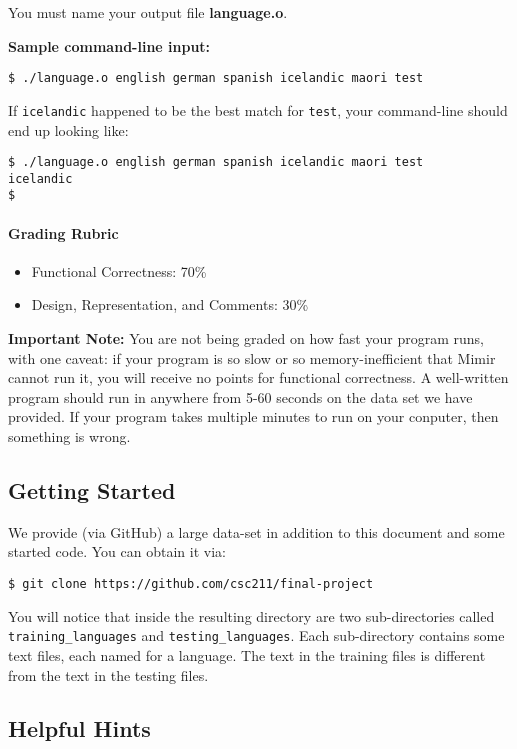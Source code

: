\documentclass[]{article}
\providecommand{\tightlist}{%
  \setlength{\itemsep}{0pt}\setlength{\parskip}{0pt}}
\let\oldparagraph\paragraph
\renewcommand{\paragraph}[1]{\oldparagraph{#1}\mbox{}}
\begin{document}
You must name your output file \textbf{language.o}.

\textbf{Sample command-line input:}

\texttt{\$ ./language.o english german spanish icelandic maori test}

If \texttt{icelandic} happened to be the best match for \texttt{test},
your command-line should end up looking like:

\texttt{\$ ./language.o english german spanish icelandic maori test}\\
\texttt{icelandic}\\
\texttt{\$ }

\paragraph{Grading Rubric}\label{grading-rubric-1}

\begin{itemize}
\tightlist
\item
  Functional Correctness: 70\%
\item
  Design, Representation, and Comments: 30\%
\end{itemize}

\textbf{Important Note:} You are not being graded on how fast your
program runs, with one caveat: if your program is so slow or so
memory-inefficient that Mimir cannot run it, you will receive no points
for functional correctness. A well-written program should run in
anywhere from 5-60 seconds on the data set we have provided. If your
program takes multiple minutes to run on your conputer, then something
is wrong.

\subsection{Getting Started}\label{getting-started}

We provide (via GitHub) a large data-set in addition to this document
and some started code. You can obtain it via:

\texttt{\$ git clone https://github.com/csc211/final-project}

You will notice that inside the resulting directory are two
sub-directories called \texttt{training\_languages} and
\texttt{testing\_languages}. Each sub-directory contains some text
files, each named for a language. The text in the training files is
different from the text in the testing files.

\subsection{Helpful Hints}\label{helpful-hints}
\end{document}
